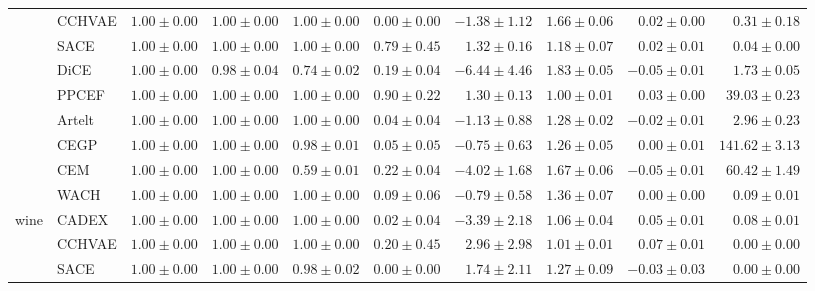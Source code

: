 \begin{table}[ht]
\begin{center}
\begin{sc}
\begin{scriptsize}
\begin{tabular}{l|l|rrrrrrrr}
 & CCHVAE & $\boldsymbol{1.00\pm{0.00}}$ & $\boldsymbol{1.00\pm{0.00}}$ & $\boldsymbol{1.00\pm{0.00}}$ & $0.00\pm{0.00}$ & $-1.38\pm{1.12}$ & $1.66\pm{0.06}$ & $0.02\pm{0.00}$ & $0.31\pm{0.18}$ \\
 & SACE & $\boldsymbol{1.00\pm{0.00}}$ & $\boldsymbol{1.00\pm{0.00}}$ & $\boldsymbol{1.00\pm{0.00}}$ & $0.79\pm{0.45}$ & $\boldsymbol{1.32\pm{0.16}}$ & $1.18\pm{0.07}$ & $0.02\pm{0.01}$ & $\boldsymbol{0.04\pm{0.00}}$ \\
 & DiCE & $\boldsymbol{1.00\pm{0.00}}$ & $0.98\pm{0.04}$ & $0.74\pm{0.02}$ & $0.19\pm{0.04}$ & $-6.44\pm{4.46}$ & $1.83\pm{0.05}$ & $-0.05\pm{0.01}$ & $1.73\pm{0.05}$ \\
 & PPCEF & $\boldsymbol{1.00\pm{0.00}}$ & $\boldsymbol{1.00\pm{0.00}}$ & $\boldsymbol{1.00\pm{0.00}}$ & $\boldsymbol{0.90\pm{0.22}}$ & $1.30\pm{0.13}$ & $\boldsymbol{1.00\pm{0.01}}$ & $\boldsymbol{0.03\pm{0.00}}$ & $39.03\pm{0.23}$ \\
 & Artelt & $\boldsymbol{1.00\pm{0.00}}$ & $\boldsymbol{1.00\pm{0.00}}$ & $\boldsymbol{1.00\pm{0.00}}$ & $0.04\pm{0.04}$ & $-1.13\pm{0.88}$ & $1.28\pm{0.02}$ & $-0.02\pm{0.01}$ & $2.96\pm{0.23}$ \\
 & CEGP & $\boldsymbol{1.00\pm{0.00}}$ & $\boldsymbol{1.00\pm{0.00}}$ & $0.98\pm{0.01}$ & $0.05\pm{0.05}$ & $-0.75\pm{0.63}$ & $1.26\pm{0.05}$ & $0.00\pm{0.01}$ & $141.62\pm{3.13}$ \\
 & CEM & $\boldsymbol{1.00\pm{0.00}}$ & $\boldsymbol{1.00\pm{0.00}}$ & $0.59\pm{0.01}$ & $0.22\pm{0.04}$ & $-4.02\pm{1.68}$ & $1.67\pm{0.06}$ & $-0.05\pm{0.01}$ & $60.42\pm{1.49}$ \\
 & WACH & $\boldsymbol{1.00\pm{0.00}}$ & $\boldsymbol{1.00\pm{0.00}}$ & $\boldsymbol{1.00\pm{0.00}}$ & $0.09\pm{0.06}$ & $-0.79\pm{0.58}$ & $1.36\pm{0.07}$ & $0.00\pm{0.00}$ & $0.09\pm{0.01}$ \\
\midrule
\multirow{9}{*}{wine} & CADEX & $\boldsymbol{1.00\pm{0.00}}$ & $\boldsymbol{1.00\pm{0.00}}$ & $\boldsymbol{1.00\pm{0.00}}$ & $0.02\pm{0.04}$ & $-3.39\pm{2.18}$ & $1.06\pm{0.04}$ & $0.05\pm{0.01}$ & $0.08\pm{0.01}$ \\
 & CCHVAE & $\boldsymbol{1.00\pm{0.00}}$ & $\boldsymbol{1.00\pm{0.00}}$ & $\boldsymbol{1.00\pm{0.00}}$ & $0.20\pm{0.45}$ & $2.96\pm{2.98}$ & $\boldsymbol{1.01\pm{0.01}}$ & $0.07\pm{0.01}$ & $\boldsymbol{0.00\pm{0.00}}$ \\
 & SACE & $\boldsymbol{1.00\pm{0.00}}$ & $\boldsymbol{1.00\pm{0.00}}$ & $0.98\pm{0.02}$ & $0.00\pm{0.00}$ & $1.74\pm{2.11}$ & $1.27\pm{0.09}$ & $-0.03\pm{0.03}$ & $\boldsymbol{0.00\pm{0.00}}$ \\

\end{tabular}
\end{scriptsize}
\end{sc}
\end{center}
\end{table}
